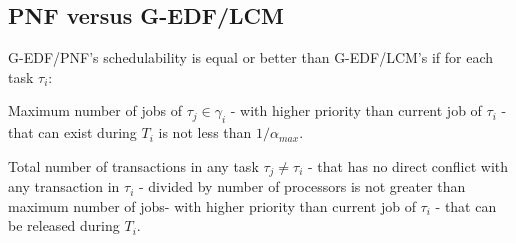 \subsection{PNF versus G-EDF/LCM}
%
\begin{clm}\label{sub:pnf_lcm_edf_comp}
G-EDF/PNF's schedulability is equal or better than G-EDF/LCM's if for each task $\tau_i$:
%
\begin{compactitem}
\item Maximum number of jobs of $\tau_{j}\in \gamma_i$ - with higher priority than
current job of $\tau_{i}$ - that can exist during $T_{i}$ is not less than $1/\alpha_{max}$.
%
\item Total number of transactions in any task $\tau_{j}\neq\tau_{i}$ - that has no direct conflict with any transaction in $\tau_{i}$ - divided by number of processors is not greater than maximum number of jobs- with higher priority than current job of $\tau_{i}$ - that can be released during $T_{i}$.
%
\end{compactitem}
%
\end{clm}
%
